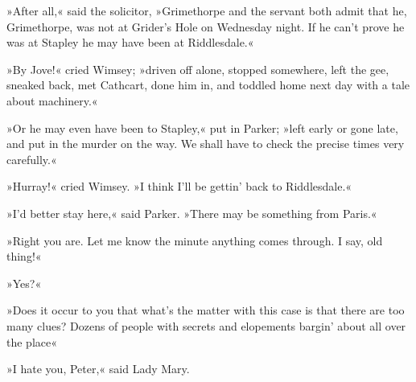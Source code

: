»After all,« said the solicitor, »Grimethorpe and the servant both admit that he, Grimethorpe, was not at Grider's Hole on Wednesday night. If he can't prove he was at Stapley he may have been at Riddlesdale.«

»By Jove!« cried Wimsey; »driven off alone, stopped somewhere, left the gee, sneaked back, met Cathcart, done him in, and toddled home next day with a tale about machinery.«

»Or he may even have been to Stapley,« put in Parker; »left early or gone late, and put in the murder on the way. We shall have to check the precise times very carefully.«

»Hurray!« cried Wimsey. »I think I'll be gettin' back to Riddlesdale.«

»I'd better stay here,« said Parker. »There may be something from Paris.«

»Right you are. Let me know the minute anything comes through. I say, old thing!«

»Yes?«

»Does it occur to you that what's the matter with this case is that there are too many clues? Dozens of people with secrets and elopements bargin' about all over the place\longdash«

»I hate you, Peter,« said Lady Mary.
